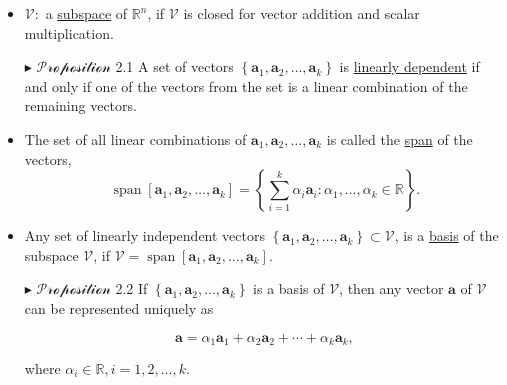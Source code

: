 \documentclass[12pt,thmsa]{article}
\begin{document}
\begin{itemize}
	\item \(\mathcal{V}:\) a \underline{subspace} of \(\mathbb{R}^{n}\), if \(\mathcal{V}\) is closed for vector addition and scalar multiplication.
\end{itemize}


\begin{itemize}
	\item[\(\blacktriangleright\)] \(\mathcal{Proposition}\) 2.1 A set of vectors \(\left\{\boldsymbol{a}_{1}, \boldsymbol{a}_{2}, \ldots, \boldsymbol{a}_{k}\right\}\) is \underline{linearly dependent} if and only if one of the vectors from the set is a linear combination of the remaining vectors.
\end{itemize}

\begin{itemize}
	\item The set of {\color{blue}all} linear combinations of \( \boldsymbol{a}_{1}, \boldsymbol{a}_{2}, \ldots, \boldsymbol{a}_{k} \) is called the \underline{span} of the vectors,
	\[ \operatorname{span}\left[\boldsymbol{a}_{1}, \boldsymbol{a}_{2}, \ldots, \boldsymbol{a}_{k}\right]=\left\{\sum_{i=1}^{k} \alpha_{i} \boldsymbol{a}_{i}: \alpha_{1}, \ldots, \alpha_{k} \in \mathbb{R}\right\}. \]
	
	\item Any set of linearly independent vectors \(\left\{\boldsymbol{a}_{1}, \boldsymbol{a}_{2}, \ldots, \boldsymbol{a}_{k}\right\} \subset \mathcal{V}\), is a \underline{basis} of the subspace \(\mathcal{V}\), if \(\mathcal{V}=\operatorname{span}\left[\boldsymbol{a}_{1}, \boldsymbol{a}_{2}, \ldots, \boldsymbol{a}_{k}\right]\).
	
	\item[\(\blacktriangleright\)] \(\mathcal{Proposition}\) 2.2 If \(\left\{\boldsymbol{a}_{1}, \boldsymbol{a}_{2}, \ldots, \boldsymbol{a}_{k}\right\}\) is a basis of \(\mathcal{V}\), then any vector \(\boldsymbol{a}\) of \(\mathcal{V}\) can be represented uniquely as
	
	\begin{equation*}
		\boldsymbol{a}=\alpha_{1} \boldsymbol{a}_{1}+\alpha_{2} \boldsymbol{a}_{2}+\cdots+\alpha_{k} \boldsymbol{a}_{k},
	\end{equation*}
	
	where \(\alpha_{i} \in \mathbb{R}, i=1,2, \ldots, k\).
\end{itemize}

\end{document}
